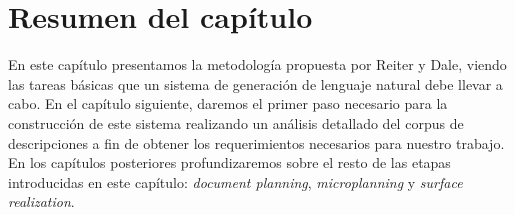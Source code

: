 \section{Resumen del capítulo}
En este capítulo presentamos la metodología propuesta por Reiter y Dale, viendo las tareas básicas que un sistema de generación de lenguaje natural debe llevar a cabo. En el capítulo siguiente, daremos el primer paso necesario para la construcción de este sistema realizando un análisis detallado del corpus de descripciones a fin de obtener los requerimientos necesarios para nuestro trabajo. En los capítulos posteriores profundizaremos sobre el resto de las etapas introducidas en este capítulo: \textit{document planning}, \textit{microplanning} y \textit{surface realization}.